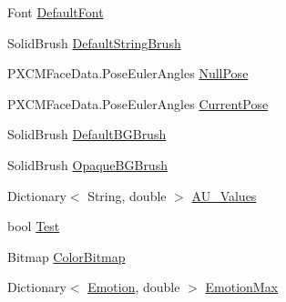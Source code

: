 \begin{DoxyCompactItemize}
Font \hyperlink{class_real_sense_1_1_model_a1e12c6ceac3f412e6b452148b1a97bb1}{Default\+Font}
\item 
Solid\+Brush \hyperlink{class_real_sense_1_1_model_aaee076946f30b272e403d39afe033b4e}{Default\+String\+Brush}
\item 
P\+X\+C\+M\+Face\+Data.\+Pose\+Euler\+Angles \hyperlink{class_real_sense_1_1_model_af6cb31aea9e1e0fd3ef87c9380e92193}{Null\+Pose}
\item 
P\+X\+C\+M\+Face\+Data.\+Pose\+Euler\+Angles \hyperlink{class_real_sense_1_1_model_a5d30cb7ac89ab7528623a695056096c4}{Current\+Pose}
\item 
Solid\+Brush \hyperlink{class_real_sense_1_1_model_a05161bcafb94b553304268ab16861a84}{Default\+B\+G\+Brush}
\item 
Solid\+Brush \hyperlink{class_real_sense_1_1_model_a14272eb96159aac12a818e2e15c36cb0}{Opaque\+B\+G\+Brush}
\item 
Dictionary$<$ String, double $>$ \hyperlink{class_real_sense_1_1_model_a5a20efa42d5391f0a8156d45f676fc34}{A\+U\+\_\+\+Values}
\item 
bool \hyperlink{class_real_sense_1_1_model_a89f4614b0f880fb6553ebcea3d2e6a6c}{Test}
\item 
Bitmap \hyperlink{class_real_sense_1_1_model_a6b3603d17577660f65fc7bbb6b097182}{Color\+Bitmap}
\item 
Dictionary$<$ \hyperlink{class_real_sense_1_1_model_a5bf3fde8f53519f7a740d8b4e0399208}{Emotion}, double $>$ \hyperlink{class_real_sense_1_1_model_ac5454f63dfead405cd1d9c229cf6790f}{Emotion\+Max}
\end{DoxyCompactItemize}


